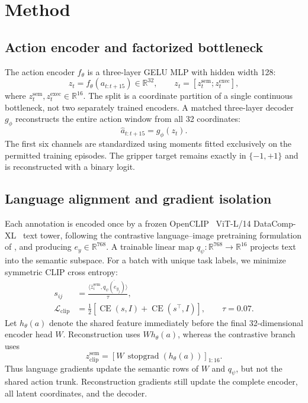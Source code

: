 \documentclass{article}
\newcommand{\R}{\mathbb{R}}
\begin{document}
\section{Method}
\label{sec:method}

\subsection{Action encoder and factorized bottleneck}

The action encoder $f_\theta$ is a three-layer GELU MLP with hidden width 128:
\begin{equation}
  z_t=f_\theta(a_{t:t+15})\in\R^{32}, \qquad
  z_t=[z_t^{\mathrm{sem}};z_t^{\mathrm{exec}}],
\end{equation}
where $z_t^{\mathrm{sem}},z_t^{\mathrm{exec}}\in\R^{16}$.  The split is a
coordinate partition of a single continuous bottleneck, not two separately
trained encoders.  A matched three-layer decoder $g_\phi$ reconstructs the
entire action window from all 32 coordinates:
\begin{equation}
  \widehat a_{t:t+15}=g_\phi(z_t).
\end{equation}
The first six channels are standardized using moments fitted exclusively on
the permitted training episodes.  The gripper target remains exactly in
$\{-1,+1\}$ and is reconstructed with a binary logit.

\subsection{Language alignment and gradient isolation}

Each annotation is encoded once by a frozen OpenCLIP~\citep{openclip}
ViT-L/14 DataComp-XL~\citep{datacomp} text tower, following the contrastive
language--image pretraining formulation of \citet{clip}, and producing
$e_y\in\R^{768}$.  A trainable linear map
$q_\psi:\R^{768}\rightarrow\R^{16}$ projects text into the semantic
subspace.  For a batch with unique task labels, we minimize symmetric CLIP
cross entropy:
\begin{align}
  s_{ij} &= \frac{\langle \bar z^{\mathrm{sem}}_i,
  \overline{q_\psi(e_{y_j})}\rangle}{\tau}, \\
  \mathcal L_{\mathrm{clip}}
  &=\tfrac12\!\left[\operatorname{CE}(s,I)+
  \operatorname{CE}(s^\top,I)\right], \qquad \tau=0.07.
\end{align}
Let $h_\theta(a)$ denote the shared feature immediately before the final
32-dimensional encoder head $W$.  Reconstruction uses $W h_\theta(a)$, whereas
the contrastive branch uses
\begin{equation}
  z_{\mathrm{clip}}^{\mathrm{sem}}
  =\left[W\,\operatorname{stopgrad}(h_\theta(a))\right]_{1:16}.
\end{equation}
Thus language gradients update the semantic rows of $W$ and $q_\psi$, but not
the shared action trunk.  Reconstruction gradients still update the complete
encoder, all latent coordinates, and the decoder.
\end{document}
